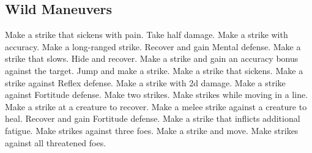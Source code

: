 \small
\subsection{Wild Maneuvers}\label{Wild Maneuvers}
\begin{spelllist}
 Make a strike that sickens with pain.
 Take half damage.
 Make a strike with  accuracy.
 Make a long-ranged strike.
 Recover and gain  Mental defense.
 Make a strike that slows.
 Hide and recover.
 Make a strike and gain an accuracy bonus against the target.
 Jump and make a strike.
 Make a strike that sickens.
 Make a strike against Reflex defense.
 Make a strike with \plus2d damage.
 Make a strike against Fortitude defense.
 Make two strikes.
 Make strikes while moving in a line.
 Make a strike at a creature to recover.
 Make a melee strike against a creature to heal.
 Recover and gain  Fortitude defense.
 Make a strike that inflicts additional fatigue.
 Make strikes against three foes.
 Make a strike and move.
 Make strikes against all threatened foes.
\end{spelllist}
